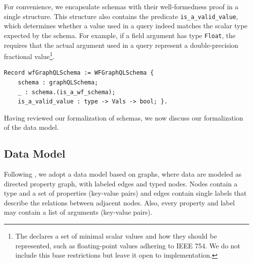 For convenience, we encapsulate schemas with their well-formedness
proof in a single structure. This structure also contains the
predicate \texttt{is_a_valid_value}, which determines whether
a value used in a query indeed matches the scalar type expected by the
schema. For example, if a field argument has type \texttt{Float}, the
\spec requires that the actual argument used in a query represent a double-precision fractional value\footnote{The \spec declares a set of minimal scalar values and how they should be represented, such as floating-point values adhering to IEEE 754. We do not include this base restrictions but leave it open to implementation.}.
%
\begin{verbatim}
Record wfGraphQLSchema := WFGraphQLSchema {
    schema : graphQLSchema;
    _ : schema.(is_a_wf_schema);
    is_a_valid_value : type -> Vals -> bool; }.
\end{verbatim}





Having reviewed our formalization of schemas, we now discuss our formalization of the data model. 



\subsection{Data Model}\label{subsec:graph}
Following \HP, we adopt a data model based on graphs, where data are
modeled as directed property graph, with labeled edges and typed
nodes. Nodes contain a type and a set of properties (key-value pairs)
and  edges contain single labels that describe the relations between
adjacent nodes. Also, every property and label may contain a list of
arguments (key-value pairs). %

